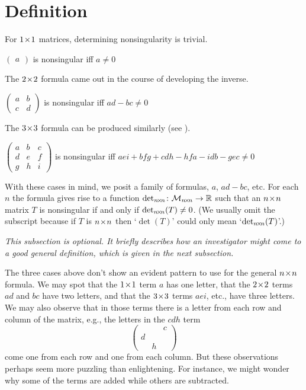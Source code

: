 \section{Def{}inition}
For \( 1 \! \times \! 1 \) matrices, determining nonsingularity
is trivial.
\begin{center}
  \( \begin{pmatrix}
          a
     \end{pmatrix}  \)
  is nonsingular iff
  \( a \neq 0 \)
\end{center}
The $2 \! \times \! 2$ formula came out in the course of developing  
the inverse. 
\begin{center}
  \( \begin{pmatrix}
           a  &b  \\
           c  &d
      \end{pmatrix}  \)
   is nonsingular iff
   \( ad-bc \neq 0 \)
\end{center}
The $3 \! \times \! 3$ formula can be produced similarly  
(see ).
\begin{center}
  \( \begin{pmatrix}
           a  &b  &c  \\
           d  &e  &f  \\
           g  &h  &i
     \end{pmatrix} \)
  is nonsingular iff
  \( aei+bfg+cdh-hfa-idb-gec \neq 0 \)
\end{center}
With these cases in mind, we posit a family of 
formulas, $a$, $ad-bc$, etc. 
For each $n$ the formula gives rise to a 
function
$\mbox{$\det_{n \! \times \! n}\colon \mathcal{M}_{n \! \times \! n}\to \mathbb{R}$}$ 
such that an $n \! \times \! n$ matrix $T$ is nonsingular if and
only if $\det_{n \! \times \! n}(T)\neq 0$.
(We usually omit the subscript because 
if \( T \) is \( n \! \times \! n \) then `\( \det(T) \)'
could only mean `\( \det_{n \! \times \! n}(T) \)'.)






\textit{This subsection is optional.
It briefly describes how an investigator might
come to a good general definition, which is given in the next 
subsection.}

The three cases above don't 
show an evident pattern to use for the general $n \! \times \! n$ formula.
We may spot that the \(1 \! \times \! 1\) term
\( a \) has one letter, that the \(2 \! \times \! 2\) terms
\(ad\) and \(bc\) have two letters, and that the \(3 \! \times \! 3\)
terms \(aei\), etc., have three letters.
We may also observe that in those terms
there is a letter from each row and column of the matrix, e.g., 
the letters in the \(cdh\) term
\begin{equation*}
   \begin{pmatrix}
          &    &c \\
      d           \\
          &h
   \end{pmatrix} 
\end{equation*}
come one from each row and one from each column.
But these observations perhaps seem more puzzling than
enlightening.
For instance, we might wonder why 
some of the terms are added while others are subtracted.

